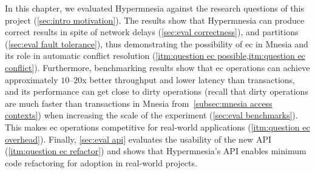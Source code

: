 In this chapter, we evaluated Hypermnesia against the research questions
of this project (\cref{sec:intro motivation}). The results show that Hypermnesia can
produce correct results in spite of network delays (\cref{sec:eval correctness}),
and partitions (\cref{sec:eval fault tolerance}), thus demonstrating the possibility
of \acrlong{ec} in Mnesia and its role in automatic conflict 
resolution (\cref{itm:question ec possible,itm:question ec conflict}).
Furthermore, benchmarking results show that \acrshort{ec} operations can achieve
approximately \(10\)--\(20\)x better throughput and lower latency than transactions, 
and its performance can get close to dirty operations (recall that dirty operations 
are much faster than transactions in Mnesia from~\cref{subsec:mnesia access contexts}) 
when increasing the scale of the experiment (\cref{sec:eval benchmarks}).
This makes \acrshort{ec} operations competitive for real-world applications
(\cref{itm:question ec overhead}).
Finally, \cref{sec:eval api} evaluates the usability of the new 
API (\cref{itm:question ec refactor}) and shows that
Hypermnesia's API enables minimum code refactoring for adoption in real-world
projects.
